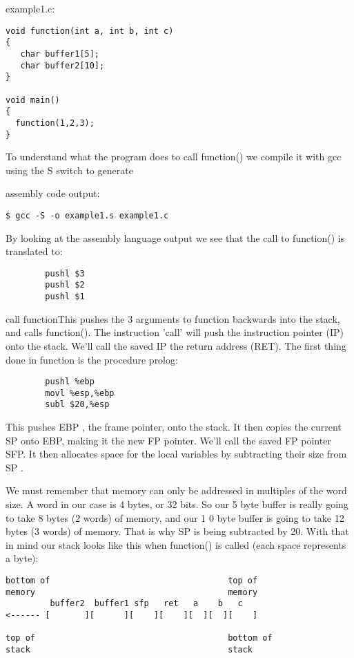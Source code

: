 \documentclass[10pt]{article}
\begin{document}
example1.c: 

\begin{lstlisting}
void function(int a, int b, int c) 
{
   char buffer1[5];
   char buffer2[10];
}

void main() 
{
  function(1,2,3);
}
\end{lstlisting}

To understand what the program does to call function() we compile it with gcc using the  S switch to generate 

assembly code output: 

\begin{verbatim}
$ gcc -S -o example1.s example1.c
\end{verbatim}

By looking at the assembly language output we see that the call to function() is translated to:

\begin{lstlisting}
        pushl $3
        pushl $2
        pushl $1
\end{lstlisting}
call functionThis pushes the 3 arguments to function backwards into the stack, and calls function().
The instruction 'call' will push the instruction pointer (IP) onto the stack.
We'll call the saved IP the return address (RET).  The first thing done in function is the procedure prolog:

\begin{lstlisting}
        pushl %ebp
        movl %esp,%ebp
        subl $20,%esp
\end{lstlisting}

This pushes EBP , the frame pointer, onto the stack.  It then copies the current SP onto EBP, making it the new 
FP pointer.  We'll call the saved FP pointer SFP.  It then allocates space for the local variables by subtracting 
their size from SP .

We must remember that memory can only be addressed in multiples of the word size.   A word in our case is 4 
bytes, or 32 bits.  So our 5 byte buffer is really going to take 8 bytes (2 words) of memory, and our 1 0 byte 
buffer is going to take 12 bytes (3 words) of memory.  That is why SP is being subtracted by 20.  With that in 
mind our stack looks like this when function() is called  (each space represents a byte):

{\small
\begin{verbatim}
bottom of                                    top of
memory                                       memory
         buffer2  buffer1 sfp   ret   a    b   c
<------ [       ][      ][    ][    ][  ][  ][    ]

top of                                       bottom of
stack                                        stack
\end{verbatim}
}
\end{document}
